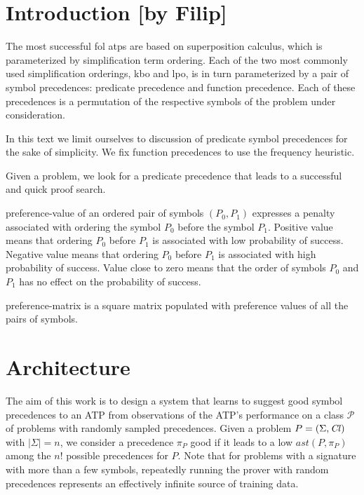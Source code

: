 \section{Introduction [by Filip]}

The most successful \gls{fol} \glspl{atp} are based on superposition calculus,
which is parameterized by simplification term ordering.
Each of the two most commonly used simplification orderings, \gls{kbo} and \gls{lpo},
is in turn parameterized by a pair of symbol precedences:
predicate precedence and function precedence.
Each of these precedences is a permutation of the respective symbols of the problem under consideration.

In this text we limit ourselves to discussion of predicate symbol precedences for the sake of simplicity.
We fix function precedences to use the frequency heuristic.

Given a problem, we look for a predicate \gls{precedence} that leads to a successful and quick proof search.

\Gls{preference-value} of an ordered pair of symbols \((P_0, P_1)\) expresses a penalty associated with ordering the symbol \(P_0\) before the symbol \(P_1\).
Positive value means that ordering \(P_0\) before \(P_1\) is associated with low probability of success.
Negative value means that ordering \(P_0\) before \(P_1\) is associated with high probability of success.
Value close to zero means that the order of symbols \(P_0\) and \(P_1\) has no effect on the probability of success.

\Gls{preference-matrix} is a square matrix populated with preference values of all the pairs of symbols.

\newpage

\section{Architecture}
\label{sec:architecture}

The aim of this work is to design a system that learns to suggest good symbol precedences to an ATP 
from observations of the ATP's performance on a class $\mathcal{P}$ of problems with randomly sampled precedences. 
Given a problem \(P = (\Sigma,\operatorname{\mathit{Cl}})\) with \(|\Sigma|=n\), we consider a precedence \(\pi_P\) good 
if it leads to a low \(\mathit{ast}(P,\pi_P)\) among the $n!$ possible precedences for \(P\).
Note that for problems with a signature with more than a few symbols, repeatedly running the prover 
with random precedences represents an effectively infinite source of training data.

